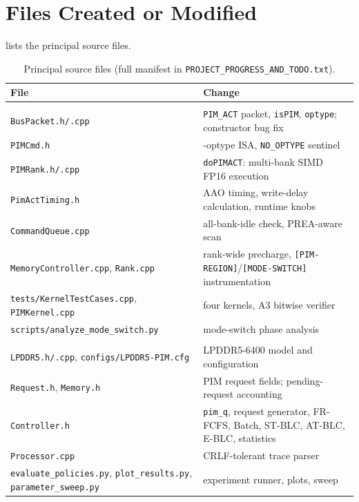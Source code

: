 \documentclass[conference]{IEEEtran}
\newcommand{\cmd}[1]{\texttt{\footnotesize #1}}
\newcommand{\stblc}{ST-BLC}
\newcommand{\atblc}{AT-BLC}
\newcommand{\eblc}{E-BLC}
\begin{document}
\section{Files Created or Modified}
 lists the principal source files.
\begin{table}[!t]
\centering
\caption{Principal source files (full manifest in \cmd{PROJECT\_PROGRESS\_AND\_TODO.txt}).}\label{tab:files}
\footnotesize
\begin{tabularx}{\textwidth}{@{}>{\raggedright\arraybackslash}p{6.6cm}>{\raggedright\arraybackslash}X@{}}
\toprule
\textbf{File} & \textbf{Change}\\
\midrule
\multicolumn{2}{@{}l}{\textit{PIMSimulator}}\\
\cmd{BusPacket.h/.cpp} & \cmd{PIM\_ACT} packet, \cmd{isPIM}, \cmd{optype}; constructor bug fix\\
\cmd{PIMCmd.h} & 35-optype ISA, \cmd{NO\_OPTYPE} sentinel\\
\cmd{PIMRank.h/.cpp} & \cmd{doPIMACT}: multi-bank SIMD FP16 execution\\
\cmd{PimActTiming.h} & AAO timing, write-delay calculation, runtime knobs\\
\cmd{CommandQueue.cpp} & all-bank-idle check, PREA-aware scan\\
\cmd{MemoryController.cpp}, \cmd{Rank.cpp} & rank-wide precharge, \cmd{[PIM-REGION]}/\cmd{[MODE-SWITCH]} instrumentation\\
\cmd{tests/KernelTestCases.cpp}, \cmd{PIMKernel.cpp} & four kernels, A3 bitwise verifier\\
\cmd{scripts/analyze\_mode\_switch.py} & mode-switch phase analysis\\
\midrule
\multicolumn{2}{@{}l}{\textit{Ramulator}}\\
\cmd{LPDDR5.h/.cpp}, \cmd{configs/LPDDR5-PIM.cfg} & LPDDR5-6400 model and configuration\\
\cmd{Request.h}, \cmd{Memory.h} & PIM request fields; pending-request accounting\\
\cmd{Controller.h} & \cmd{pim\_q}, request generator, FR-FCFS, Batch, \stblc, \atblc, \eblc, statistics\\
\cmd{Processor.cpp} & CRLF-tolerant trace parser\\
\cmd{evaluate\_policies.py}, \cmd{plot\_results.py}, \cmd{parameter\_sweep.py} & experiment runner, plots, sweep\\
\bottomrule
\end{tabularx}
\end{table}
\end{document}
